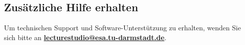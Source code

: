 \subsection*{Zusätzliche Hilfe erhalten}
Um technischen Support und Software-Unterstützung zu erhalten, wenden Sie sich bitte an \href{mailto:lecturestudio@esa.tu-darmstadt.de}{\textbf{lecturestudio@esa.tu-darmstadt.de}}.
